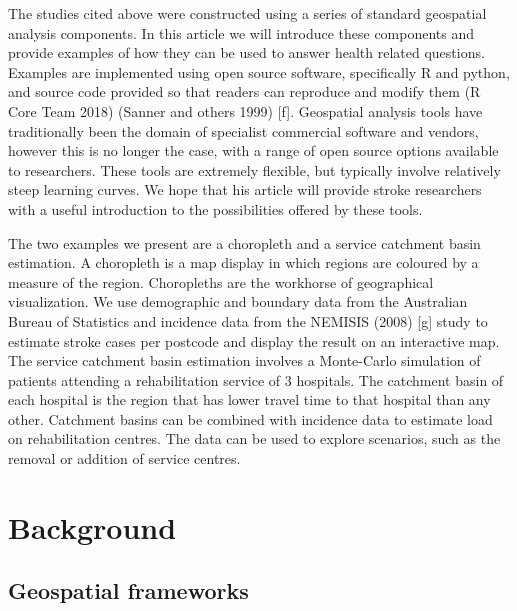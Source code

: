 \documentclass[]{article}
\begin{document}
The studies cited above were constructed using a series of standard
geospatial analysis components. In this article we will introduce these
components and provide examples of how they can be used to answer health
related questions. Examples are implemented using open source software,
specifically R and python, and source code provided so that readers can
reproduce and modify them (R Core Team 2018) (Sanner and others 1999)
{[}f{]}. Geospatial analysis tools have traditionally been the domain of
specialist commercial software and vendors, however this is no longer
the case, with a range of open source options available to researchers.
These tools are extremely flexible, but typically involve relatively
steep learning curves. We hope that his article will provide stroke
researchers with a useful introduction to the possibilities offered by
these tools.

The two examples we present are a choropleth and a service catchment
basin estimation. A choropleth is a map display in which regions are
coloured by a measure of the region. Choropleths are the workhorse of
geographical visualization. We use demographic and boundary data from
the Australian Bureau of Statistics and incidence data from the NEMISIS
(2008) {[}g{]} study to estimate stroke cases per postcode and display
the result on an interactive map. The service catchment basin estimation
involves a Monte-Carlo simulation of patients attending a rehabilitation
service of 3 hospitals. The catchment basin of each hospital is the
region that has lower travel time to that hospital than any other.
Catchment basins can be combined with incidence data to estimate load on
rehabilitation centres. The data can be used to explore scenarios, such
as the removal or addition of service centres.

\hypertarget{background}{%
\section{Background}\label{background}}

\hypertarget{geospatial-frameworks}{%
\subsection{Geospatial frameworks}\label{geospatial-frameworks}}
\end{document}

